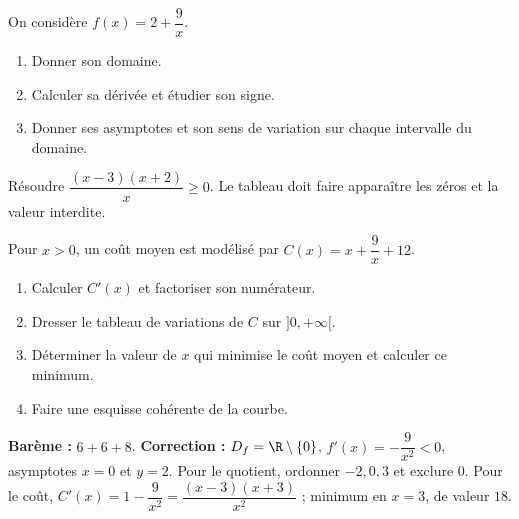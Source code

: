 \begin{exercise}
On considère $f(x)=2+\dfrac{9}x$.
\begin{enumerate}
\item Donner son domaine.
\item Calculer sa dérivée et étudier son signe.
\item Donner ses asymptotes et son sens de variation sur chaque intervalle du domaine.
\end{enumerate}
\end{exercise}
\begin{exercise}
Résoudre $\dfrac{(x-3)(x+2)}x\geq0$. Le tableau doit faire apparaître les zéros et la valeur interdite.
\end{exercise}
\begin{exercise}
Pour $x>0$, un coût moyen est modélisé par $C(x)=x+\dfrac{9}x+12$.
\begin{enumerate}
\item Calculer $C'(x)$ et factoriser son numérateur.
\item Dresser le tableau de variations de $C$ sur $]0,+\infty[$.
\item Déterminer la valeur de $x$ qui minimise le coût moyen et calculer ce minimum.
\item Faire une esquisse cohérente de la courbe.
\end{enumerate}
\end{exercise}
\begin{solution}\textbf{Barème :} $6+6+8$. \textbf{Correction :} $D_f=\R\setminus\{0\}$, $f'(x)=-\dfrac{9}{x^2}<0$, asymptotes $x=0$ et $y=2$. Pour le quotient, ordonner $-2,0,3$ et exclure $0$. Pour le coût, $C'(x)=1-\dfrac{9}{x^2}=\dfrac{(x-3)(x+3)}{x^2}$ ; minimum en $x=3$, de valeur $18$.\end{solution}

